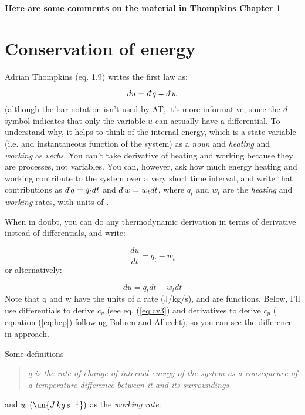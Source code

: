 \documentclass[12pt]{article}
\newcommand{\dbar}{d\mkern-6mu\mathchar'26}
\begin{document}
\newcommand{\vect}[1]{\boldsymbol{\vec{#1}}}
\pagestyle{first}


\textbf{Here are some comments on the material in Thompkins Chapter 1}

\section{Conservation of energy}

Adrian Thompkins (eq. 1.9) writes the first law as:


\begin{equation}
  \label{eq:firstwh}
  du = \dbar q - \dbar w
\end{equation}
(although the bar notation isn't used by AT, it's more informative, since
the $\dbar$ symbol indicates that only the variable $u$ can actually have 
a differential.  To understand why, it helps to think of the internal energy,
which is a state variable (i.e. and instantaneous function of the system) as
a \textit{noun} and \textit{heating} and \textit{working} as \textit{verbs}.
You can't take derivative of heating and working because they are processes,
not variables.    You can, however, ask how much energy heating and working
contribute to the system over a very short time interval, and write
that contributions as $\dbar q = q_t dt$ and $\dbar w= w_t dt$, where 
$q_t$ and $w_t$ are the \textit{heating } and \textit{working} rates, with
units of .

When in doubt, you can do any thermodynamic derivation in terms of
derivative instead of differentials, and write:

\begin{equation}
  \label{eq:first}
  \frac{du}{dt} = q_t - w_t
\end{equation}
or alternatively:

\begin{equation}
  \label{eq:firstb}
  du = q_t dt  - w_t dt
\end{equation}
Note that q and w have the units of a rate (J/kg/s), and are functions.
Below, I'll use differentials to derive $c_v$ (see eq. (\ref{eq:cv3}) and derivatives to derive $c_p$ (
equation (\ref{eq:hcp}) following Bohren and Albecht),
so you can see the difference in approach.

Some definitions

\begin{quote}
  \textit{q is the rate of change of internal energy of the system as a consequence of
  a temperature difference between it and its surroundings}
\end{quote}
and $w\ (\un{J\,kg\,s^{-1}})$ as the \textit{working rate}:
\end{document}
